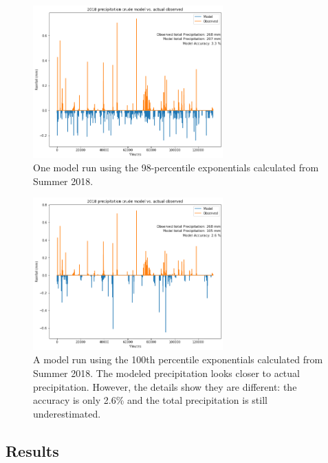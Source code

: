 \documentclass[11pt]{report}
\begin{document}
\clearpage
\begin{figure}[t]
  \centering
  \includegraphics[width=0.65\textwidth]{Figures/better_one_run.png}
  \caption[First run using Summer 2018 climatology] {\label{crudemodel} One
    model run using the 98-percentile exponentials calculated from Summer
    2018.}
\end{figure}
\begin{figure}[b]
  \centering
  \includegraphics[width=0.65\textwidth]{Figures/best_one_run.png}
  \caption[Modified run using Summer 2018 climatology] {\label{crudermodel}
    A model run using the 100th percentile exponentials calculated from
    Summer 2018. The modeled precipitation looks closer to actual
    precipitation. However, the details show they are different: the
    accuracy is only 2.6\% and the total precipitation is still
    underestimated.}
\end{figure}

\clearpage

\subsection{Results}\label{sec:sfp_r}
\end{document}

